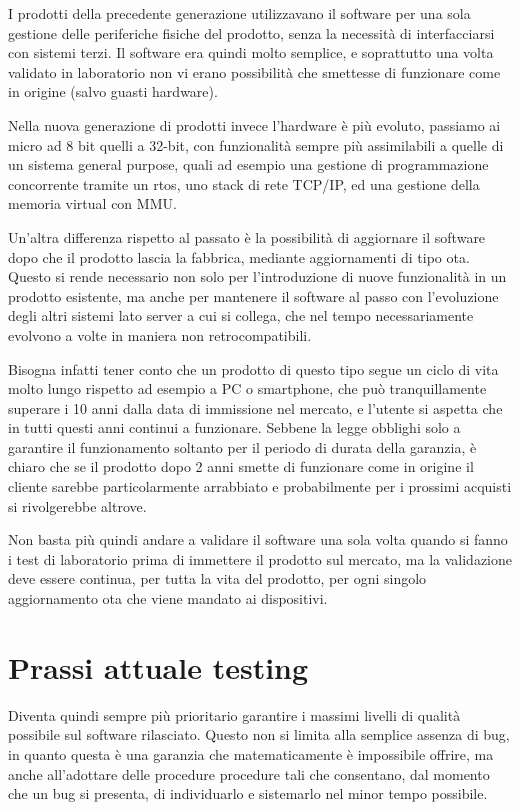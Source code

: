 \documentclass[12pt,a4paper,twoside,titlepage]{book}
\begin{document}
I prodotti della precedente generazione utilizzavano il software per una sola gestione
delle periferiche fisiche del prodotto, senza la necessità di interfacciarsi con sistemi
terzi. Il software era quindi molto semplice, e soprattutto una volta validato in laboratorio 
non vi erano possibilità che smettesse di funzionare come in origine (salvo guasti hardware). 

Nella nuova generazione di prodotti invece l'hardware è più evoluto, passiamo ai \gls{micro} 
ad 8 bit quelli a 32-bit, con funzionalità sempre più assimilabili a quelle di un sistema
general purpose, quali ad esempio una gestione di programmazione concorrente tramite un \acrfull{rtos}, uno
stack di rete TCP/IP, ed una gestione della memoria virtual con MMU.

Un'altra differenza rispetto al passato è la possibilità di aggiornare il software dopo
che il prodotto lascia la fabbrica, mediante aggiornamenti di tipo \acrfull{ota}.
Questo si rende necessario non solo per l'introduzione di nuove funzionalità in
un prodotto esistente, ma anche per mantenere il software al passo con l'evoluzione degli
altri sistemi lato server a cui si collega, che nel tempo necessariamente evolvono a volte 
in maniera non retrocompatibili.

Bisogna infatti tener conto che un prodotto di questo tipo segue un ciclo di vita molto lungo
rispetto ad esempio a PC o smartphone, che può tranquillamente superare i 10 anni dalla data di
immissione nel mercato, e l'utente si aspetta che in tutti questi anni continui a funzionare. 
Sebbene la legge obblighi solo a garantire il funzionamento soltanto per il periodo di durata 
della garanzia, è chiaro che se il prodotto dopo 2 anni smette di funzionare come in origine 
il cliente sarebbe particolarmente arrabbiato e probabilmente per i prossimi acquisti si rivolgerebbe altrove. 

Non basta più quindi andare a validare il software una sola volta quando si fanno i test 
di laboratorio prima di immettere il prodotto sul mercato, ma la validazione deve essere continua, 
per tutta la vita del prodotto, per ogni singolo aggiornamento \acrfull{ota} che viene mandato 
ai dispositivi. 

\section{Prassi attuale testing}

Diventa quindi sempre più prioritario garantire i massimi livelli di qualità possibile
sul software rilasciato. Questo non si limita alla semplice assenza di bug, in quanto
questa è una garanzia che matematicamente è impossibile offrire, ma anche all'adottare
delle procedure procedure tali che consentano, dal momento che un bug si
presenta, di individuarlo e sistemarlo nel minor tempo possibile.
\end{document}
